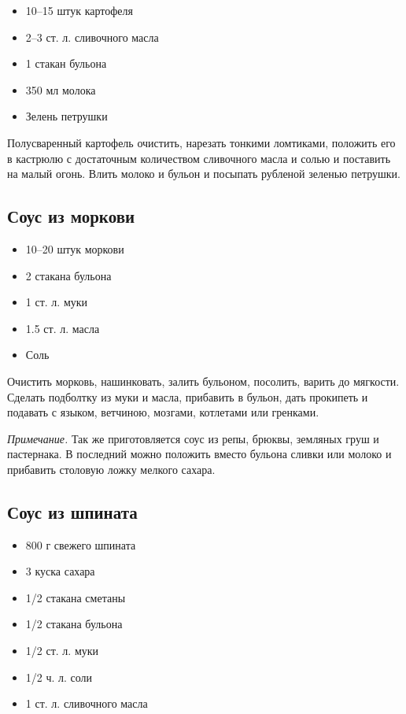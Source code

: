 \begin{itemize}
	\item 10–15 штук картофеля 
    \item 2–3 ст. л. сливочного масла 
    \item 1 стакан бульона
    \item 350 мл молока 
    \item Зелень петрушки
\end{itemize}

Полусваренный картофель очистить, нарезать тонкими ломтиками, положить его в кастрюлю с достаточным количеством сливочного масла и солью и поставить на малый огонь. Влить молоко и бульон и посыпать рубленой зеленью петрушки.

\subsection{Соус из моркови}

\begin{itemize}
	\item 10–20 штук моркови 
    \item 2 стакана бульона 
    \item 1 ст. л. муки 
    \item 1.5 ст. л. масла 
    \item Соль
\end{itemize}

Очистить морковь, нашинковать, залить бульоном, посолить, варить до мягкости. Сделать подболтку из муки и масла, прибавить в бульон, дать прокипеть и подавать с языком, ветчиною, мозгами, котлетами или гренками.

\emph{Примечание.} Так же приготовляется соус из репы, брюквы, земляных груш и пастернака. В последний можно положить вместо бульона сливки или молоко и прибавить столовую ложку мелкого сахара.

\subsection{Соус из шпината}

\begin{itemize}
	\item 800 г свежего шпината 
    \item 3 куска сахара 
    \item 1/2 стакана сметаны 
    \item 1/2 стакана бульона 
    \item 1/2 ст. л. муки 
    \item 1/2 ч. л. соли 
    \item 1 ст. л. сливочного масла
\end{itemize}


